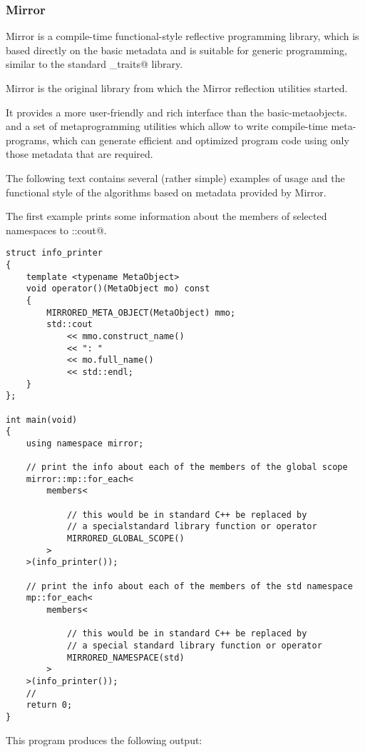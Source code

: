 \subsubsection{Mirror}

Mirror is a compile-time functional-style reflective programming library,
which is based directly on the basic metadata and is suitable for generic programming,
similar to the standard \verb@type_traits@ library.

Mirror is the original library from which the Mirror reflection utilities started.

It provides a more user-friendly and rich interface than the basic-metaobjects.
and a set of metaprogramming utilities which allow
to write compile-time meta-programs, which can generate efficient
and optimized program code using only those metadata that are required.

The following text contains several (rather simple) examples of usage
and the functional style of the algorithms based on metadata provided by Mirror.

The first example prints some information about the members of selected
namespaces to \verb@std::cout@.

\begin{lstlisting}
struct info_printer
{
    template <typename MetaObject>
    void operator()(MetaObject mo) const
    {
        MIRRORED_META_OBJECT(MetaObject) mmo;
        std::cout
            << mmo.construct_name()
            << ": "
            << mo.full_name()
            << std::endl;
    }
};

int main(void)
{
    using namespace mirror;

    // print the info about each of the members of the global scope
    mirror::mp::for_each<
        members<

            // this would be in standard C++ be replaced by 
            // a specialstandard library function or operator
            MIRRORED_GLOBAL_SCOPE()
        >
    >(info_printer());

    // print the info about each of the members of the std namespace
    mp::for_each<
        members<

            // this would be in standard C++ be replaced by
            // a special standard library function or operator
            MIRRORED_NAMESPACE(std)
        >
    >(info_printer());
    //
    return 0;
}
\end{lstlisting}

This program produces the following output:

